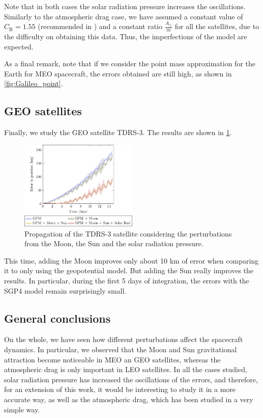 \documentclass[../main.tex]{subfiles}
\begin{document}
Note that in both cases the solar radiation pressure increases the oscillations. Similarly to the atmospheric drag case, we have assumed a constant value of $C_\mathrm{R}=1.55$ (recommended in \cite{montenbruck}) and a constant ratio $\frac{A_\odot}{m}$ for all the satellites, due to the difficulty on obtaining this data. Thus, the imperfections of the model are expected.

As a final remark, note that if we consider the point mass approximation for the Earth for MEO spacecraft, the errors obtained are still high, as shown in \cref{fig:Galileo_point}.

\subsection{GEO satellites}
Finally, we study the GEO satellite TDRS-3. The results are shown in \cref{fig:TDRS}.
\begin{figure}[ht]
  \centering
  \includegraphics[width=0.5\textwidth]{Images/simulation/TDRS-3.pdf}
  \caption{Propagation of the TDRS-3 satellite considering the perturbations from the Moon, the Sun and the solar radiation pressure.}
  \label{fig:TDRS}
\end{figure}

This time, adding the Moon improves only about 10 km of error when comparing it to only using the geopotential model. But adding the Sun really improves the results. In particular, during the first 5 days of integration, the errors with the SGP4 model remain surprisingly small.

\subsection{General conclusions}
On the whole, we have seen how different perturbations affect the spacecraft dynamics. In particular, we observed that the Moon and Sun gravitational attraction become noticeable in MEO an GEO satellites, whereas the atmospheric drag is only important in LEO satellites. In all the cases studied, solar radiation pressure has increased the oscillations of the errors, and therefore, for an extension of this work, it would be interesting to study it in a more accurate way, as well as the atmospheric drag, which has been studied in a very simple way.
\end{document}
